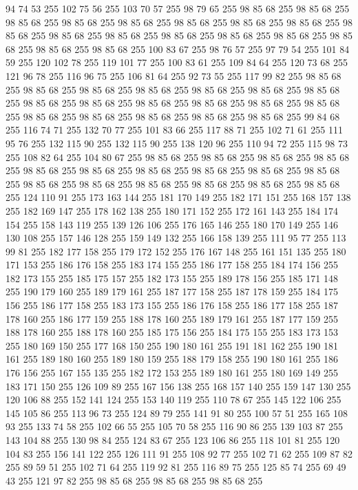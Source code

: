94 74 53 255 102 75 56 255 103 70 57 255 98 79 65 255 98 85 68 255 98 85 68 255 98 85 68 255 98 85 68 255 98 85 68 255 98 85 68 255 98 85 68 255 98 85 68 255 98 85 68 255 98 85 68 255 98 85 68 255 98 85 68 255 98 85 68 255 98 85 68 255 98 85 68 255 98 85 68 255 98 85 68 255 100 83 67 255 98 76 57 255 97 79 54 255 101 84 59 255 120 102 78 255 119 101 77 255 100 83 61 255 109 84 64 255 120 73 68 255 121 96 78 255 116 96 75 255 106 81 64 255 92 73 55 255 117 99 82 255 98 85 68 255 98 85 68 255 98 85 68 255 98 85 68 255 98 85 68 255 98 85 68 255 98 85 68 255 98 85 68 255 98 85 68 255 98 85 68 255 98 85 68 255 98 85 68 255 98 85 68 255 98 85 68 255 98 85 68 255 98 85 68 255 98 85 68 255 98 85 68 255 99 84 68 255 116 74 71 255 132 70 77 255 101 83 66 255 117 88 71 255 102 71 61 255 111 95 76 255 132 115 90 255 132 115 90 255 138 120 96 255 110 94 72 255
115 98 73 255 108 82 64 255 104 80 67 255 98 85 68 255 98 85 68 255 98 85 68 255 98 85 68 255 98 85 68 255 98 85 68 255 98 85 68 255 98 85 68 255 98 85 68 255 98 85 68 255 98 85 68 255 98 85 68 255 98 85 68 255 98 85 68 255 98 85 68 255 98 85 68 255 124 110 91 255 173 163 144 255 181 170 149 255 182 171 151 255 168 157 138 255 182 169 147 255 178 162 138 255 180 171 152 255 172 161 143 255 184 174 154 255 158 143 119 255 139 126 106 255 176 165 146 255 180 170 149 255 146 130 108 255 157 146 128 255 159 149 132 255 166 158 139 255 111 95 77 255 113 99 81 255 182 177 158 255 179 172 152 255 176 167 148 255 161 151 135 255 180 171 153 255 186 176 158 255 183 174 155 255 186 177 158 255 184 174 156 255 182 173 155 255 185 175 157 255 182 173 155 255 189 178 156 255 185 171 148 255 190 179 160 255 189 179 161 255 187 177 158 255 187 178 159 255 184 175 156 255 186 177 158 255 183 173 155 255 186 176 158 255 186 177 158 255 187 178 160 255 186 177 159 255
188 178 160 255 189 179 161 255 187 177 159 255 188 178 160 255 188 178 160 255 185 175 156 255 184 175 155 255 183 173 153 255 180 169 150 255 177 168 150 255 190 180 161 255 191 181 162 255 190 181 161 255 189 180 160 255 189 180 159 255 188 179 158 255 190 180 161 255 186 176 156 255 167 155 135 255 182 172 153 255 189 180 161 255 180 169 149 255 183 171 150 255 126 109 89 255 167 156 138 255 168 157 140 255 159 147 130 255 120 106 88 255 152 141 124 255 153 140 119 255 110 78 67 255 145 122 106 255 145 105 86 255 113 96 73 255 124 89 79 255 141 91 80 255 100 57 51 255 165 108 93 255 133 74 58 255 102 66 55 255 105 70 58 255 116 90 86 255 139 103 87 255 143 104 88 255 130 98 84 255 124 83 67 255 123 106 86 255 118 101 81 255 120 104 83 255 156 141 122 255 126 111 91 255 108 92 77 255 102 71 62 255 109 87 82 255 89 59 51 255 102 71 64 255 119 92 81 255 116 89 75 255 125 85 74 255 69 49 43 255 121 97 82 255 98 85 68 255 98 85 68 255 98 85 68 255
